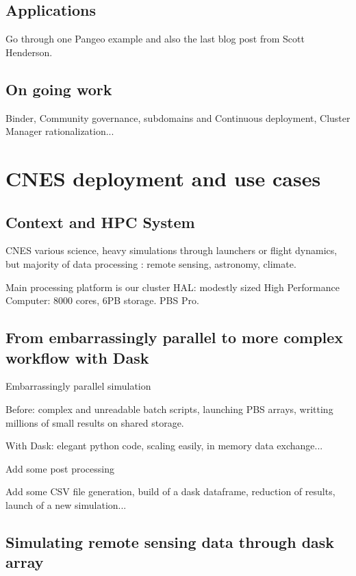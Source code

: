 \documentclass{article}
\begin{document}
\subsection{Applications}
\label{ssec:applications}

Go through one Pangeo example and also the last blog post from Scott Henderson.

\subsection{On going work}
\label{ssec:ongowork}

Binder, Community governance, subdomains and Continuous deployment, Cluster Manager rationalization...

\section{CNES deployment and use cases}
\label{sec:cnes}

\subsection{Context and HPC System}
\label{ssec:context}

CNES various science, heavy simulations through launchers or flight dynamics, but majority of data processing : remote sensing, astronomy, climate.

Main processing platform is our cluster HAL: modestly sized High Performance Computer: 8000 cores, 6PB storage. PBS Pro.

\subsection{From embarrassingly parallel to more complex workflow with Dask}
\label{ssec:usecase1}

Embarrassingly parallel simulation

Before: complex and unreadable batch scripts, launching PBS arrays, writting millions of small results on shared storage.

With Dask: elegant python code, scaling easily, in memory data exchange...

Add some post processing

Add some CSV file generation, build of a dask dataframe, reduction of results, launch of a new simulation...

\subsection{Simulating remote sensing data through dask array}
\label{ssec:usecase2}
\end{document}

